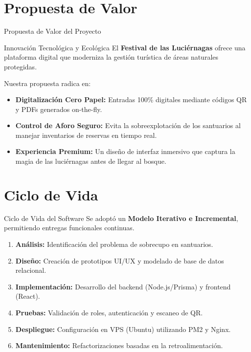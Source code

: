 \documentclass{beamer}
\begin{document}
\section{Propuesta de Valor}
\begin{frame}{Propuesta de Valor del Proyecto}
  \begin{block}{Innovación Tecnológica y Ecológica}
    El \textbf{Festival de las Luciérnagas} ofrece una plataforma digital que moderniza la gestión turística de áreas naturales protegidas. 
  \end{block}
  \vspace{0.2cm}
  Nuestra propuesta radica en:
  \begin{itemize}
      \item \textbf{Digitalización Cero Papel:} Entradas 100\% digitales mediante códigos QR y PDFs generados on-the-fly.
      \item \textbf{Control de Aforo Seguro:} Evita la sobreexplotación de los santuarios al manejar inventarios de reservas en tiempo real.
      \item \textbf{Experiencia Premium:} Un diseño de interfaz inmersivo que captura la magia de las luciérnagas antes de llegar al bosque.
  \end{itemize}
\end{frame}

\section{Ciclo de Vida}
\begin{frame}{Ciclo de Vida del Software}
  Se adoptó un \textbf{Modelo Iterativo e Incremental}, permitiendo entregas funcionales continuas.
  \vspace{0.3cm}
  \begin{enumerate}
      \item \textbf{Análisis:} Identificación del problema de sobrecupo en santuarios.
      \item \textbf{Diseño:} Creación de prototipos UI/UX y modelado de base de datos relacional.
      \item \textbf{Implementación:} Desarrollo del backend (Node.js/Prisma) y frontend (React).
      \item \textbf{Pruebas:} Validación de roles, autenticación y escaneo de QR.
      \item \textbf{Despliegue:} Configuración en VPS (Ubuntu) utilizando PM2 y Nginx.
      \item \textbf{Mantenimiento:} Refactorizaciones basadas en la retroalimentación.
  \end{enumerate}
\end{frame}
\end{document}
